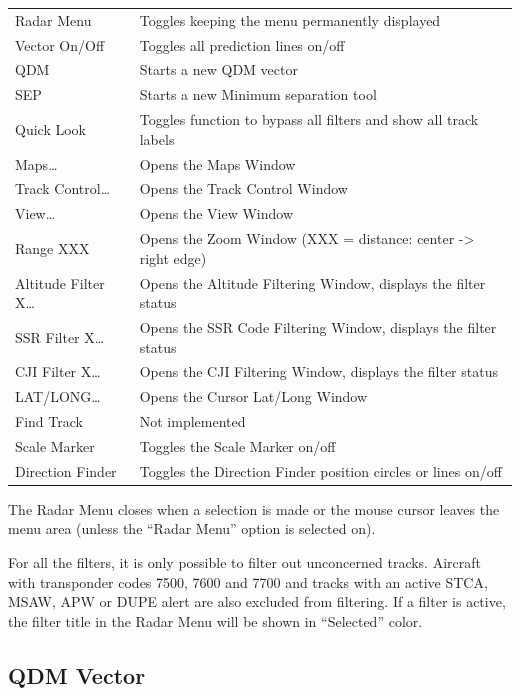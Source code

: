 \documentclass[11pt,a4paper]{memoir}
\begin{document}
\begin{tabular}{l l}
    Radar Menu          & Toggles keeping the menu permanently displayed\\
    Vector On/Off       & Toggles all prediction lines on/off\\
    QDM                 & Starts a new QDM vector\\
    SEP                 & Starts a new Minimum separation tool\\
    Quick Look          & Toggles function to bypass all filters and show all track labels\\
    Maps…               & Opens the Maps Window\\
    Track Control…      & Opens the Track Control Window\\
    View…               & Opens the View Window\\
    Range XXX           & Opens the Zoom Window (XXX = distance: center -> right edge)\\
    Altitude Filter X…  & Opens the Altitude Filtering Window, displays the filter status\\
    SSR Filter X…       & Opens the SSR Code Filtering Window, displays the filter status\\
    CJI Filter X…       & Opens the CJI Filtering Window, displays the filter status\\
    LAT/LONG…           & Opens the Cursor Lat/Long Window\\
    Find Track          & Not implemented\\
    Scale Marker        & Toggles the Scale Marker on/off\\
    Direction Finder    & Toggles the Direction Finder position circles or lines on/off\\
\end{tabular}

The Radar Menu closes when a selection is made or the mouse cursor leaves the menu area (unless the “Radar Menu” option is selected on).

For all the filters, it is only possible to filter out unconcerned tracks. Aircraft with transponder codes 7500, 7600 and 7700 and tracks with an active STCA, MSAW, APW or DUPE alert are also excluded from filtering. If a filter is active, the filter title in the Radar Menu will be shown in “Selected” color.

\subsection{QDM Vector}
\label{qdm}
\end{document}
